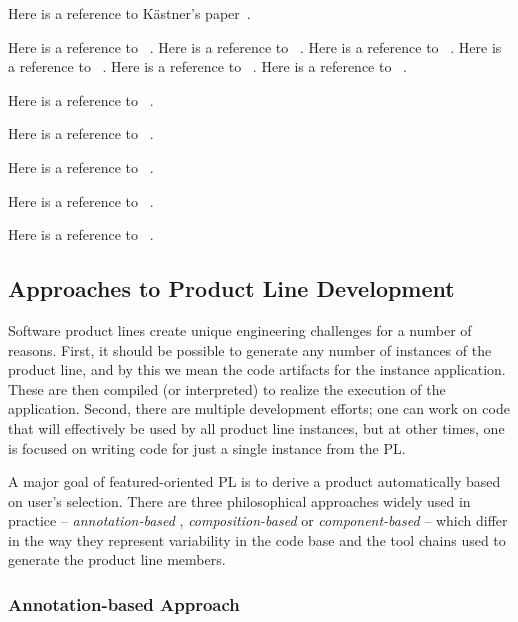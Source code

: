 Here is a reference to K\"{a}stner's paper~\cite{Kastner:2012}.

Here is a reference to ~\cite{leich2005tool}.
Here is a reference to ~\cite{proksch2014tool}.
Here is a reference to ~\cite{7203038}.
Here is a reference to ~\cite{Sayre:2005:UMA:1082983.1083277}.
Here is a reference to ~\cite{Setyautami:2016:UPD:2934466.2934479}.
Here is a reference to ~\cite{Sousa:2016:EFM:2934466.2934475}.

Here is a reference to ~\cite{Arcaini:2017:ARV:3106195.3106206}.

Here is a reference to ~\cite{Vasilevskiy:2016:TRP:2934466.2934484}.

Here is a reference to ~\cite{Kuhn:2015:CPC:2791060.2791092}.

Here is a reference to ~\cite{Schaefer:2010:DPS:1885639.1885647}.

Here is a reference to ~\cite{Apel:2008:AFF:1428476.1428480}.


\subsection{Approaches to Product Line Development}

Software product lines create unique engineering challenges for a number
of reasons. First, it should be possible to generate any number of
instances of the product line, and by this we mean the code artifacts
for the instance application. These are then compiled (or interpreted)
to realize the execution of the application. Second, there are multiple
development efforts; one can work on code that will effectively be used
by all product line instances, but at other times, one is focused on
writing code for just a single instance from the PL.

A major goal of featured-oriented PL is to derive a product
automatically based on user’s selection. There are three philosophical
approaches widely used in practice -- \textit{annotation-based} ,
\textit{composition-based} or \textit{component-based} -- which differ
in the way they represent variability in the code base and the tool
chains used to generate the product line members.

\subsubsection{Annotation-based Approach}

